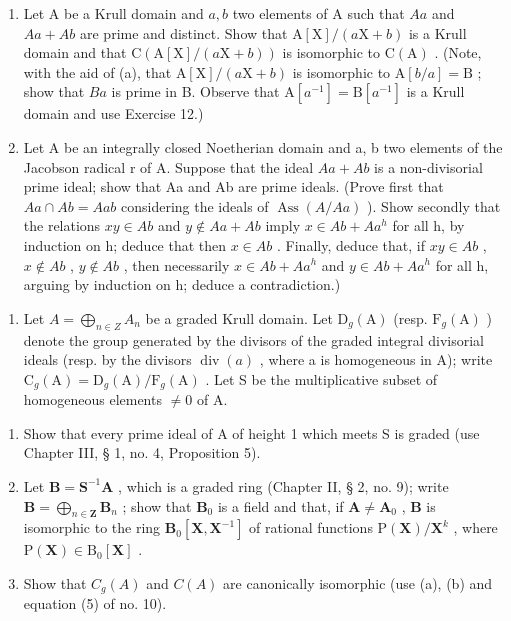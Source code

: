 \begin{enumerate}
\def\labelenumi{(\alph{enumi})}
\setcounter{enumi}{1}
\item
  Let A be a Krull domain and \(a, b\) two elements of A such that \(Aa\) and \(Aa + Ab\) are prime and distinct. Show that \(\mathrm{A}[\mathrm{X}] / (a\mathrm{X} + b)\) is a Krull domain and that \(\mathrm{C}(\mathrm{A}[\mathrm{X}] / (a\mathrm{X} + b))\) is isomorphic to \(\mathrm{C}(\mathrm{A})\) . (Note, with the aid of (a), that \(\mathrm{A}[\mathrm{X}] / (a\mathrm{X} + b)\) is isomorphic to \(\mathrm{A}[b / a] = \mathrm{B}\) ; show that \(Ba\) is prime in B. Observe that \(\mathrm{A}[a^{-1}] = \mathrm{B}[a^{-1}]\) is a Krull domain and use Exercise 12.)
\item
  Let A be an integrally closed Noetherian domain and a, b two elements of the Jacobson radical r of A. Suppose that the ideal \(Aa + Ab\) is a non-divisorial prime ideal; show that Aa and Ab are prime ideals. (Prove first that \(Aa \cap Ab = Aab\) considering the ideals of \(\operatorname{Ass}(A/Aa)\) ). Show secondly that the relations \(xy \in Ab\) and \(y \notin Aa + Ab\) imply \(x \in Ab + Aa^{h}\) for all h, by induction on h; deduce that then \(x \in Ab\) . Finally, deduce that, if \(xy \in Ab\) , \(x \notin Ab\) , \(y \notin Ab\) , then necessarily \(x \in Ab + Aa^{h}\) and \(y \in Ab + Aa^{h}\) for all h, arguing by induction on h; deduce a contradiction.)
\end{enumerate}

\begin{enumerate}
\def\labelenumi{\arabic{enumi}.}
\setcounter{enumi}{15}
\tightlist
\item
  Let \(A = \bigoplus_{n \in Z} A_n\) be a graded Krull domain. Let \(\mathrm{D}_g(\mathrm{A})\) (resp. \(\mathrm{F}_g(\mathrm{A})\) ) denote the group generated by the divisors of the graded integral divisorial ideals (resp. by the divisors \(\operatorname{div}(a)\) , where a is homogeneous in A); write \(\mathrm{C}_g(\mathrm{A}) = \mathrm{D}_g(\mathrm{A}) / \mathrm{F}_g(\mathrm{A})\) . Let S be the multiplicative subset of homogeneous elements \(\neq 0\) of A.
\end{enumerate}

\begin{enumerate}
\def\labelenumi{(\alph{enumi})}
\item
  Show that every prime ideal of A of height 1 which meets S is graded (use Chapter III, § 1, no. 4, Proposition 5).
\item
  Let \(\mathbf{B} = \mathbf{S}^{-1}\mathbf{A}\) , which is a graded ring (Chapter II, § 2, no. 9); write \(\mathbf{B} = \bigoplus_{n\in \mathbf{Z}}\mathbf{B}_n\) ; show that \(\mathbf{B}_0\) is a field and that, if \(\mathbf{A}\neq \mathbf{A}_0\) , \(\mathbf{B}\) is isomorphic to the ring \(\mathbf{B}_0[\mathbf{X},\mathbf{X}^{-1}]\) of rational functions \(\mathrm{P}(\mathbf{X}) / \mathbf{X}^k\) , where \(\mathrm{P}(\mathbf{X})\in \mathrm{B}_0[\mathbf{X}]\) .
\item
  Show that \(C_{g}(A)\) and \(C(A)\) are canonically isomorphic (use (a), (b) and equation (5) of no. 10).
\end{enumerate}

